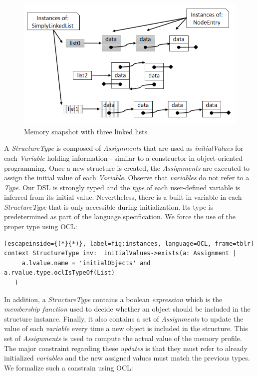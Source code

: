 \begin{figure}
\centering
\includegraphics[width=0.65\linewidth]{chapter6/fig/lists}
\caption{Memory snapshot with three linked lists}
\label{fig:simple_snapshot}
\end{figure}

A \textit{StructureType} is composed of \textit{Assignments} that are used as \textit{initialValues} for each \textit{Variable} holding information - similar to a constructor in object-oriented programming.
Once a new structure is created, the \textit{Assignments} are executed to assign the initial value of each \textit{Variable}.
Observe that \textit{variables} do not refer to a \textit{Type}.
Our DSL is strongly typed and the \textit{type} of each user-defined variable is inferred from its initial value.
Nevertheless, there is a built-in variable in each \textit{StructureType} that is only accessible during initialization.
Its type is predetermined as part of the language specification.
We force the use of the proper type using OCL:

\begin{lstlisting}[escapeinside={(*}{*)}, label=fig:instances, language=OCL, frame=tblr]
context StructureType inv:  initialValues->exists(a: Assignment | 
     a.lvalue.name = 'initialObjects' and a.rvalue.type.oclIsTypeOf(List)
   ) 
\end{lstlisting}

In addition, a \textit{StructureType} contains a boolean \textit{expression} which is the \textit{membership function} used to decide whether an object should be included in the structure instance.
Finally, it also contains a set of \textit{Assignments} to update the value of each \textit{variable} every time a new object is included in the structure.
This set of \textit{Assignments} is used to compute the actual value of the memory profile.
The major constraint regarding these \textit{updates} is that they must refer to already initialized \textit{variables} and the new assigned values must match the previous types.
We formalize such a constrain using OCL:

